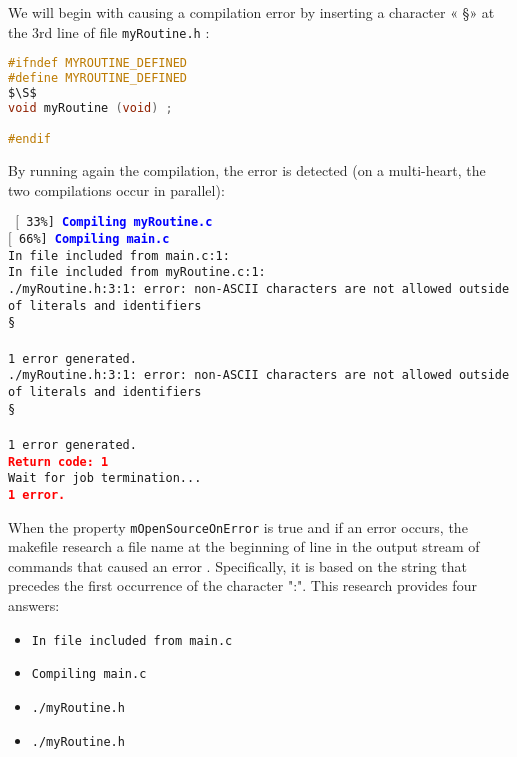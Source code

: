 \documentclass[a4paper,11pt]{extarticle}
\begin{document}
We will begin with causing a compilation error by inserting a character « \S » at the 3rd line of file \texttt{myRoutine.h} :
\begin{lstlisting}[mathescape,language=C]
#ifndef MYROUTINE_DEFINED
#define MYROUTINE_DEFINED
$\S$
void myRoutine (void) ;

#endif
\end{lstlisting}

By running again the compilation, the error is detected (on a multi-heart, the two compilations occur in parallel):

\begin{mdframed}[hidealllines=true,backgroundcolor=lightgray!20]
\noindent\texttt{\footnotesize
$[$~33\%]~\textcolor{blue}{\bf Compiling myRoutine.c}\\
$[$~66\%]~\textcolor{blue}{\bf Compiling main.c}\\
In file included from main.c:1:\\
In file included from myRoutine.c:1:\\
./myRoutine.h:3:1: error: non-ASCII characters are not allowed outside of literals and identifiers\\
\S\\
\^\\
1 error generated.\\
./myRoutine.h:3:1: error: non-ASCII characters are not allowed outside of literals and identifiers\\
\S\\
\^\\
1 error generated.\\
\textcolor{red}{\bf Return code: 1}\\
Wait for job termination...\\
\textcolor{red}{\bf 1 error.}
}
\end{mdframed}

When the property \texttt{mOpenSourceOnError} is true and if an error occurs, the makefile research a file name at the beginning of line in the output stream of commands that caused an error . Specifically, it is based on the string that precedes the first occurrence of the character ":". This research provides four answers:

\begin{itemize}
\item \colorbox{lightgray!20}{\tt In file included from main.c}
\item \colorbox{lightgray!20}{\tt Compiling main.c}
\item \colorbox{lightgray!20}{\tt ./myRoutine.h}
\item \colorbox{lightgray!20}{\tt ./myRoutine.h}
\end{itemize}
\end{document}
